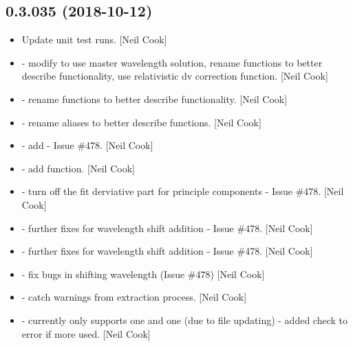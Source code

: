 \documentclass[a4paper,10pt,english]{report}
\begin{document}
\subsection{0.3.035 (2018-10-12)}
\label{\detokenize{misc/changelog:id297}}\begin{itemize}
\item {} 
Update unit test runs. {[}Neil Cook{]}

\item {} 
 - modify  to use master
wavelength solution, rename functions to better describe
functionality, use relativistic dv correction function. {[}Neil Cook{]}

\item {} 
 - rename functions to better describe functionality.
{[}Neil Cook{]}

\item {} 
 - rename aliases to better describe functions.
{[}Neil Cook{]}

\item {} 
 - add  - Issue \#478. {[}Neil
Cook{]}

\item {} 
 - add  function. {[}Neil Cook{]}

\item {} 
 - turn off the fit derviative part for
principle components - Issue \#478. {[}Neil Cook{]}

\item {} 
 - further fixes for wavelength shift addition -
Issue \#478. {[}Neil Cook{]}

\item {} 
 - further fixes for wavelength shift addition - Issue
\#478. {[}Neil Cook{]}

\item {} 
 - fix bugs in shifting wavelength (Issue \#478) {[}Neil
Cook{]}

\item {} 
 - catch warnings from extraction process.
{[}Neil Cook{]}

\item {} 
 - currently only supports one  and one
 (due to file updating) - added check to error if more used.
{[}Neil Cook{]}


\end{itemize}
\end{document}
